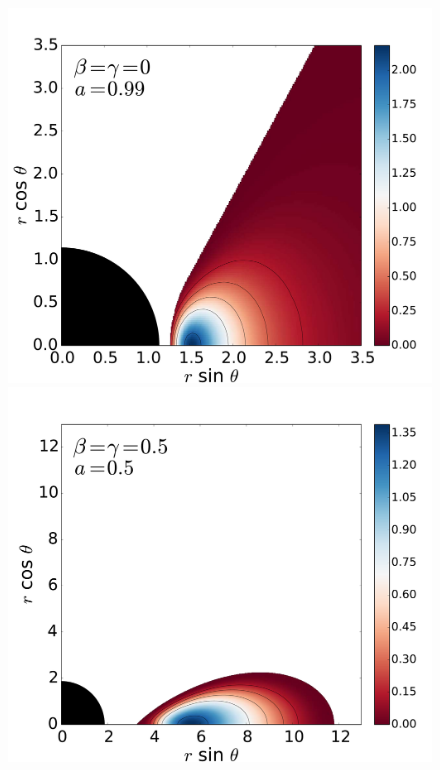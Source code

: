 \documentclass{aa}
\begin{document}
\begin{figure}
\includegraphics[scale=0.14]{figures/fig2_1_3.pdf}
\\
\includegraphics[scale=0.14]{figures/fig2_2_1.pdf}
\hspace{-0.3cm}

\end{figure}
\end{document}
